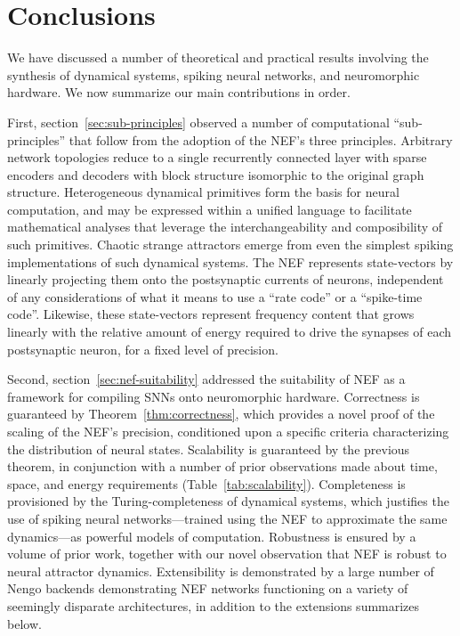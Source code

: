 \chapter{Conclusions}
\label{chapt:conclusions}

We have discussed a number of theoretical and practical results involving the synthesis of dynamical systems, spiking neural networks, and neuromorphic hardware.
We now summarize our main contributions in order.

First, section~\ref{sec:sub-principles} observed a number of computational ``sub-principles'' that follow from the adoption of the NEF's three principles.
Arbitrary network topologies reduce to a single recurrently connected layer with sparse encoders and decoders with block structure isomorphic to the original graph structure.
Heterogeneous dynamical primitives form the basis for neural computation, and may be expressed within a unified language to facilitate mathematical analyses that leverage the interchangeability and composibility of such primitives.
Chaotic strange attractors emerge from even the simplest spiking implementations of such dynamical systems.
The NEF represents state-vectors by linearly projecting them onto the postsynaptic currents of neurons,  independent of any considerations of what it means to use a ``rate code'' or a ``spike-time code''.
Likewise, these state-vectors represent frequency content that grows linearly with the relative amount of energy required to drive the synapses of each postsynaptic neuron, for a fixed level of precision.

Second, section~\ref{sec:nef-suitability} addressed the suitability of NEF as a framework for compiling SNNs onto neuromorphic hardware.
Correctness is guaranteed by Theorem~\ref{thm:correctness}, which provides a novel proof of the scaling of the NEF's precision, conditioned upon a specific criteria characterizing the distribution of neural states.
Scalability is guaranteed by the previous theorem, in conjunction with a number of prior observations made about time, space, and energy requirements (Table~\ref{tab:scalability}).
Completeness is provisioned by the Turing-completeness of dynamical systems, which justifies the use of spiking neural networks---trained using the NEF to approximate the same dynamics---as powerful models of computation.
Robustness is ensured by a volume of prior work, together with our novel observation that NEF is robust to neural attractor dynamics.
Extensibility is demonstrated by a large number of Nengo backends demonstrating NEF networks functioning on a variety of seemingly disparate architectures, in addition to the extensions summarizes below.

